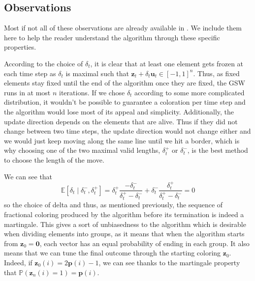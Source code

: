 \documentclass[12pt]{article}
\begin{document}


\subsection{Observations}
Most if not all of these observations are already available in \cite{blues}. We include them here to help the reader understand the algorithm through these specific properties.

According to the choice of $\delta_t$, it is clear that at least one element gets frozen at each time step as $\delta_t$ is maximal such that $\textbf{z}_t+\delta_t\textbf{u}_t\in[-1,1]^n$. Thus, as fixed elements stay fixed until the end of the algorithm once they are fixed, the GSW runs in at most $n$ iterations. If we chose $\delta_t$ according to some more complicated distribution, it wouldn't be possible to guarantee a coloration per time step and the algorithm would lose most of its appeal and simplicity. Additionally, the update direction depends on the elements that are alive. Thus if they did not change between two time steps, the update direction would not change either and we would just keep moving along the same line until we hit a border, which is why choosing one of the two maximal valid lengths, $\delta_t^+$ or $\delta_t^-$, is the best method to choose the length of the move.

We can see that
$$\mathbb{E}[\delta_t \mid \delta_t^-, \delta_t^+] = \delta_t^+\frac{-\delta_t^-}{\delta_t^+-\delta_t^-} + \delta_t^- \frac{\delta_t^+}{\delta_t^+-\delta_t^-} =0$$
so the choice of delta and thus, as mentioned previously, the sequence of fractional coloring produced by the algorithm before its termination is indeed a martingale. This gives a sort of unbiasedness to the algorithm which is desirable when dividing elements into groups, as it means that when the algorithm starts from $\textbf{z}_0=\textbf{0}$, each vector has an equal probability of ending in each group. It also means that we can tune the final outcome through the starting coloring $\textbf{z}_0$. Indeed, if $\textbf{z}_0(i)=2\textbf{p}(i)-1$, we can see thanks to the martingale property that $\mathbb{P}(\textbf{z}_n(i)=1)=\textbf{p}(i)$.
\end{document}
